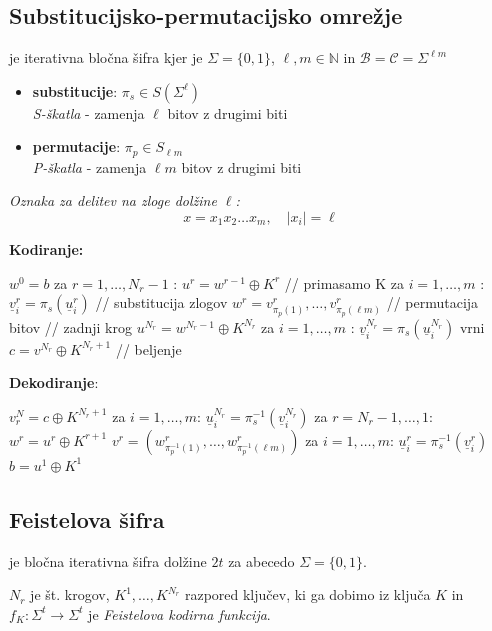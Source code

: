 \begin{multicols}{4}
\subsection*{Substitucijsko-permutacijsko omrežje}
je iterativna bločna šifra kjer je $\Sigma = \{0,1\}$, $\ell, m \in \mathbb{N}$ in $\mathcal{B} = \mathcal{C} = \Sigma^{\ell m}$

\begin{itemize}
	\item \textbf{substitucije}: $\pi_s \in S(\Sigma^\ell)$ \\
	\textit{S-škatla} - zamenja $\ell$ bitov z drugimi biti
	\item \textbf{permutacije}: $\pi_p \in S_{\ell m}$ \\
	\textit{P-škatla} - zamenja $\ell m$ bitov z drugimi biti
\end{itemize}

\textit{Oznaka za delitev na zloge dolžine $\ell$:}
\[ x = x_1 x_2 \dots x_m, \quad |x_i| = \ell \]

\textbf{Kodiranje:}
\begin{koda}
$w^0 = b$
za $r = 1, \dots, N_r - 1$ :
	$u^r = w^{r-1} \oplus K^r$ // primasamo K
	za $i = 1, \dots, m$ :
		$\underline{v}_i^r = \pi_s(\underline{u}_i^r)$ // substitucija zlogov
	$w^r = v_{\pi_p(1)}^r, \dots, v_{\pi_p(\ell m)}^r$ // permutacija bitov
// zadnji krog
$u^{N_r} = w^{N_r - 1} \oplus K^{N_r}$
za $ i = 1, \dots, m$ :
	$\underline{v}_i^{N_r} = \pi_s(\underline{u}_i^{N_r})$
vrni $c = v^{N_r} \oplus K^{N_r + 1}$  // beljenje
\end{koda}

\textbf{Dekodiranje}:
\begin{koda}
$v^N_r = c \oplus K^{N_r + 1}$
za $ i = 1, \dots, m$:
	$\underline{u}_i^{N_r} = \pi_s^{-1}(\underline{v}_i^{N_r})$
za $ r = N_r - 1, \dots, 1$:
	$w^r = u^r \oplus K^{r+1}$
	$v^r = (w_{\pi_p^{-1}(1)}^r, \dots, w_{\pi_p^{-1}(\ell m)}^r)$
	za $ i = 1, \dots, m$:
		$\underline{u}^r_i = \pi_s^{-1}(\underline{v}_i^r)$
$b = u^1 \oplus K^1$
\end{koda}

\subsection*{Feistelova šifra}
je bločna iterativna šifra dolžine $2t$ za abecedo $\Sigma = \{0, 1\}$.

$N_r$ je št. krogov, $K^1, \dots, K^{N_r}$ razpored ključev, ki ga dobimo iz ključa
$K$ in $f_K: \Sigma^t \to \Sigma^t$ je \textit{Feistelova kodirna funkcija}.


\end{multicols}
